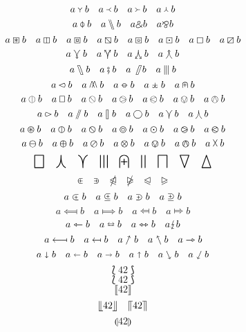 \documentclass{article}
\begin{document}
\[
a \Ydown b \quad a \Yleft b \quad a \Yright b \quad a \Yup b
\]
\[
a \baro b \quad a \bbslash b \quad a \binampersand b \quad a \bindnasrepma b
\]
\[
a \boxast b \quad a \boxbar b \quad a \boxbox b \quad a \boxbslash b \quad a \boxcircle b \quad a \boxdot b \quad a \boxempty b \quad a \boxslash b
\]
\[
a \curlyveedownarrow b \quad a \curlyveeuparrow b \quad a \curlywedgedownarrow b \quad a \curlywedgeuparrow b
\]
\[
a \fatbslash b \quad a \fatsemi b \quad a \fatslash b \quad a \interleave b
\]
\[
a \leftslice b \quad a \merge b \quad a \minuso b \quad a \moo b \quad a \nplus b
\]
\[
a \obar b \quad a \oblong b \quad a \obslash b \quad a \ogreaterthan b \quad a \olessthan b \quad a \ovee b \quad a \owedge b
\]
\[
a \rightslice b \quad a \sslash b \quad a \talloblong b \quad a \varbigcirc b \quad a \varcurlyvee b \quad a \varcurlywedge b
\]
\[
a \varoast b \quad a \varobar b \quad a \varobslash b \quad a \varocircle b \quad a \varodot b \quad a \varogreaterthan b \quad a \varolessthan b
\]
\[
a \varominus b \quad a \varoplus b \quad a \varoslash b \quad a \varotimes b \quad a \varovee b \quad a \varowedge b \quad a \vartimes b
\]
\[
\bigbox \quad \bigcurlywedge \quad \bigcurlyvee \quad \biginterleave \quad \bignplus \quad \bigparallel \quad \bigsqcap \quad \bigtriangledown \quad \bigtriangleup
\]
\[
\inplus \quad \niplus \quad \ntrianglelefteqslant \quad \ntrianglerighteqslant \quad \trianglelefteqslant \quad \trianglerighteqslant
\]
\[
a \subsetplus b \quad a \subsetpluseq b \quad a \supsetplus b \quad a \supsetpluseq b
\]
\[
a \Longmapsfrom b \quad a \Longmapsto b \quad a \Mapsfrom b \quad a \Mapsto b
\]
\[
a \leftarrowtriangle b \quad a \leftrightarroweq b \quad a \leftrightarrowtriangle b \quad a \lightning b
\]
\[
a \longmapsfrom b \quad a \mapsfrom b \quad a \nnearrow b \quad a \nnwarrow b \quad a \rightarrowtriangle b
\]
\[
a \shortdownarrow b \quad a \shortleftarrow b \quad a \shortrightarrow b \quad a \shortuparrow b \quad a \ssearrow b \quad a \sswarrow b
\]
\[
\Lbag 42 \Rbag
\]
\[
\lbag 42 \rbag
\]
\[
\llbracket 42 \rrbracket
\]
\[
\llfloor 42 \rrfloor \quad \llceil 42 \rrceil
\]
\[
\llparenthesis 42 \rrparenthesis
\]
\end{document}
